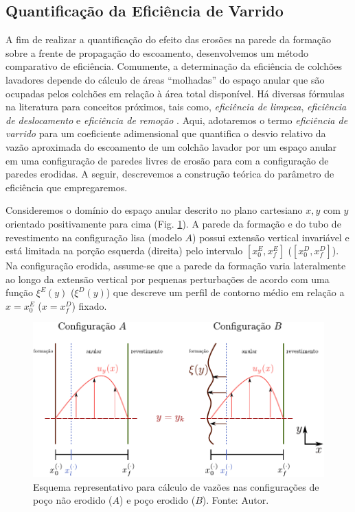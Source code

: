 \subsection{Quantificação da Eficiência de Varrido}
    
A fim de realizar a quantificação do efeito das erosões na parede da formação sobre a frente de propagação do escoamento, desenvolvemos um método comparativo de eficiência. Comumente, a determinação da eficiência de colchões lavadores depende do cálculo de áreas ``molhadas'' do espaço anular que são ocupadas pelos colchões em relação à área total disponível. Há diversas fórmulas na literatura para conceitos próximos, tais como, \emph{eficiência de limpeza}, \emph{eficiência de deslocamento} \cite{Monica} e \emph{eficiência de remoção} \cite{ARANHA}. Aqui, adotaremos o termo \emph{eficiência de varrido} para um coeficiente adimensional que quantifica o desvio relativo da vazão aproximada do escoamento de um colchão lavador por um espaço anular em uma configuração de paredes livres de erosão para com a configuração de paredes erodidas. A seguir, descrevemos a construção teórica do parâmetro de eficiência que empregaremos.  

Consideremos o domínio do espaço anular descrito no plano cartesiano $x,y$ com $y$ orientado positivamente para cima (Fig. \ref{fig:eta-esquema}). A parede da formação e do tubo de revestimento na configuração lisa (modelo $A$) possui extensão vertical invariável e está limitada na porção esquerda (direita) pelo intervalo $[x_0^E,x_f^E]$ ($[x_0^D,x_f^D]$). Na configuração erodida, assume-se que a parede da formação varia lateralmente ao longo da extensão vertical por pequenas perturbações de acordo com uma função $\xi^E(y)$ ($\xi^D(y)$) que descreve um perfil de contorno médio em relação a $x = x_0^E$ ($x = x_f^D$) fixado.
\begin{figure}[h]
	\centering
	\includegraphics[scale=.8]{img/eta-esquema.pdf}
	\caption{Esquema representativo para cálculo de vazões nas configurações de poço não erodido ($A$) e poço erodido ($B$). Fonte: Autor.}
	\label{fig:eta-esquema}
\end{figure}

